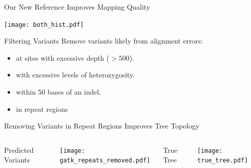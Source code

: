 \documentclass{beamer}
\begin{document}
\begin{frame}{Our New Reference Improves Mapping Quality}
\begin{center}
\texttt{[image: both\_hist.pdf]}
\end{center}
\end{frame}

\begin{frame}{Filtering Variants}
Remove variants likely from alignment errors:
\begin{itemize}
	\item at sites with excessive depth ($>$500).
	\item with excessive levels of heterozygosity.
	\item within 50 bases of an indel.
	\item in repeat regions 
\end{itemize}
\end{frame}


\begin{frame}{Removing Variants in Repeat Regions Improves Tree Topology}
	\begin{columns}
		\begin{center}
		Predicted Variants
		\end{center}
		\texttt{[image: gatk\_repeats\_removed.pdf]}
		\begin{center}
		True Tree
		\end{center}
		\texttt{[image: true\_tree.pdf]}
	\end{columns}
\end{frame}
\end{document}
